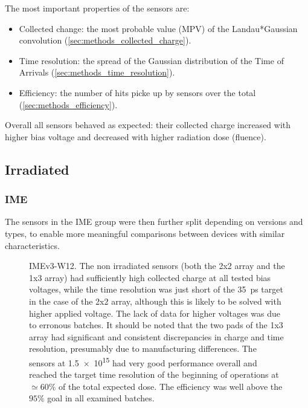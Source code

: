 The most important properties of the sensors are:

\begin{itemize}
    \item Collected change: the most probable value (MPV) of the Landau*Gaussian convolution (\ref{sec:methods_collected_charge}).
    \item Time resolution: the spread of the Gaussian distribution of the Time of Arrivals (\ref{sec:methods_time_resolution}).
    \item Efficiency: the number of hits picke up by sensors over the total (\ref{sec:methods_efficiency}).
\end{itemize}

Overall all sensors behaved as expected: their collected charge increased with higher bias voltage and decreased with higher radiation dose (fluence).

\subsection{Irradiated}

\subsubsection{IME}

The sensors in the IME group were then further split depending on versions and types, to enable more meaningful comparisons between devices with similar characteristics.

\begin{figure}[h!tbp]
    \centering
    \hfill
    \vfill
    \captionsetup{width=\captionwidth}
    \caption{IMEv3-W12. The non irradiated sensors (both the 2x2 array and the 1x3 array) had sufficiently high collected charge at all tested bias voltages, while the time resolution was just short of the \qty{35}{\pico\second} target in the case of the 2x2 array, although this is likely to be solved with higher applied voltage. The lack of data for higher voltages was due to erronous batches. It should be noted that the two pads of the 1x3 array had significant and consistent discrepancies in charge and time resolution, presumably due to manufacturing differences. The sensors at \qty{1.5e15}{\neutroneq} had very good performance overall and reached the target time resolution of the beginning of operations at $\simeq60\%$ of the total expected dose. The efficiency was well above the $95\%$ goal in all examined batches.}
\end{figure}

